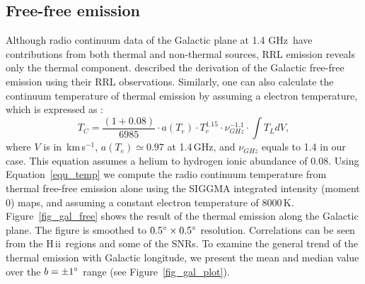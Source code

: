 \documentclass[manuscript]{aastex61}
\newcommand{\hii}{{\rm H\,}{{\sc ii}}}
\newcommand{\kms}{\,km\,s$^{-1}$}
\newcommand{\ghz}{\,GHz}
\begin{document}
\subsection{Free-free emission} \label{sec_gal_free}
Although radio continuum data of the Galactic plane at 1.4\,\ghz\ have contributions from both thermal and non-thermal sources, RRL emission reveals only the thermal component.
\citet{Alves2012} described the derivation of the Galactic free-free emission using their RRL observations.
Similarly, one can also calculate the continuum temperature of thermal emission by assuming a electron temperature, which is expressed as \citep{Mezger1967a, Lockman1978, Quireza2006a}:
\begin{equation}
  T_C=
  \frac{(1+0.08)}{6985}\cdot a(T_e) \cdot T_e^{1.15} \cdot \nu _{GHz}^{-1.1} \cdot \int T_L dV,
  \label{equ_temp}
\end{equation}
where $V$ is in \kms, $a(T_e) \simeq 0.97$ at 1.4\,GHz, and $\nu_{GHz}$ equals to 1.4 in our case.  This equation assumes a helium to hydrogen ionic abundance of 0.08.
Using Equation~\ref{equ_temp} we compute the radio continuum temperature from thermal free-free emission alone using the SIGGMA integrated intensity (moment 0) maps, and assuming a constant electron temperature of 8000\,K.
Figure~\ref{fig_gal_free} shows the result of the thermal emission along the Galactic plane.
The figure is smoothed to $0.5\mbox{$^\circ$} \times 0.5\mbox{$^\circ$}$ resolution.
Correlations can be seen from the \hii\ regions and some of the SNRs.
To examine the general trend of the thermal emission with Galactic longitude, we present the mean and median value over the $b=\pm1\mbox{$^\circ$}$ range (see Figure~\ref{fig_gal_plot}).
\end{document}

